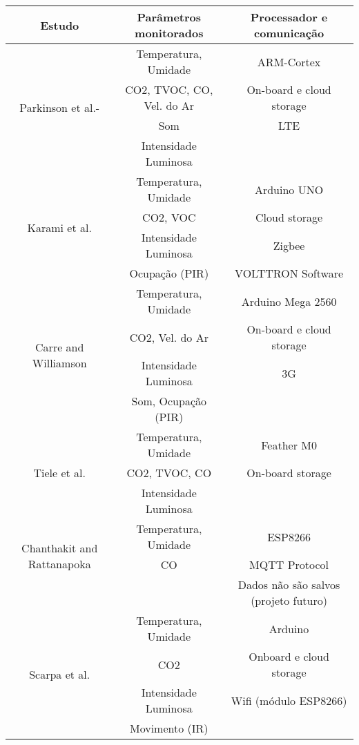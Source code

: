 \documentclass[../monografia.tex]{subfiles}
\begin{document}
\begin{center}
\begin{longtable}{ |c|c|c| } 
\hline %
\textbf{Estudo} & \textbf{Parâmetros monitorados} & \textbf{Processador e comunicação} \\ 
\hline %
\multirow{4}{8em}{Parkinson et al.\cite{PARKINSON201915}-\cite{PARKINSON2019241}} & Temperatura, Umidade & ARM-Cortex \\
& CO2, TVOC, CO, Vel. do Ar & On-board e cloud storage \\ 
& Som & LTE \\ 
& Intensidade Luminosa  &  \\ 
\hline %
\multirow{4}{8em}{Karami et al.\cite{KARAMI2018412}} & Temperatura, Umidade & Arduino UNO \\ 
& CO2, VOC & Cloud storage \\ 
& Intensidade Luminosa & Zigbee \\ 
& Ocupação (PIR)  & VOLTTRON Software \\ 
\hline %
\multirow{4}{8em}{Carre and Williamson\cite{CARRE20181751}} & Temperatura, Umidade & Arduino Mega 2560 \\ 
& CO2, Vel. do Ar & On-board e cloud storage \\ 
& Intensidade Luminosa & 3G \\ 
& Som, Ocupação (PIR)  &  \\ 
\hline %
\multirow{3}{8em}{Tiele et al.\cite{Tiele2018}} & Temperatura, Umidade & Feather M0 \\ 
& CO2, TVOC, CO & On-board storage \\ 
& Intensidade Luminosa &  \\ 
\hline %
\multirow{3}{8em}{Chanthakit and Rattanapoka\cite{Chanthakit2018}} & Temperatura, Umidade & ESP8266 \\  %
& CO & MQTT Protocol \\ 
&  & \multirow{2}{12em}{Dados não são salvos (projeto futuro)} \\ 
& & \\
\hline %
\multirow{4}{8em}{Scarpa et al.\cite{SCARPA2017282}} & Temperatura, Umidade & Arduino \\ 
& CO2 & Onboard e cloud storage \\ 
& Intensidade Luminosa & Wifi (módulo ESP8266) \\ 
& Movimento (IR)  &\\

\end{longtable}
\end{center}
\end{document}
